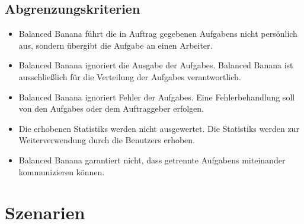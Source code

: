 \documentclass[a4paper,12pt]{article}
\begin{document}
\subsection{Abgrenzungskriterien}
\begin{itemize}[nosep]

	\item Balanced Banana führt die in Auftrag gegebenen \glspl{Aufgaben} nicht persönlich aus, sondern übergibt die \gls{Aufgabe} an einen \gls{Arbeiter}.
	
	\item Balanced Banana ignoriert die Ausgabe der \glspl{Aufgabe}. Balanced Banana ist ausschließlich für die Verteilung der \glspl{Aufgabe} verantwortlich.

	\item Balanced Banana ignoriert Fehler der \glspl{Aufgabe}. Eine \gls{Fehlerbehandlung} soll von den \glspl{Aufgabe} oder dem \gls{Auftraggeber} erfolgen.

	\item Die erhobenen \glspl{Statistik} werden nicht ausgewertet. Die \glspl{Statistik} werden zur Weiterverwendung durch die \glspl{Benutzer} erhoben.
	
	\item Balanced Banana garantiert nicht, dass getrennte \glspl{Aufgaben} miteinander kommunizieren können.
	
\end{itemize}



\clearpage
\section{Szenarien}
\end{document}

